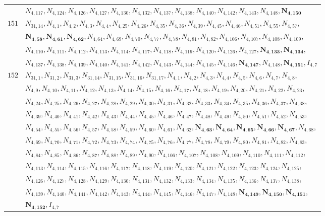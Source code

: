 \documentclass{amsart}
\theoremstyle{plain}
\theoremstyle{definition}
\theoremstyle{remark}
\begin{document}
{\begin{longtable}{ll}
& $N_{4,117}, N_{4,124}, N_{4,126}, N_{4,127}, N_{4,130}, N_{4,132}, N_{4,137}, N_{4,138}, N_{4,140}, N_{4,142}, N_{4,143}, N_{4,148}, \bm{N_{4,150}}$\\
%
$151$ & $N_{31,14}, N_{4,1}, N_{4,2}, N_{4,3}, N_{4,4}, N_{4,25}, N_{4,26}, N_{4,35}, N_{4,36}, N_{4,39}, N_{4,45}, N_{4,46}, N_{4,51}, N_{4,55}, N_{4,57}$,\\ 
& $\bm{N_{4,58}}, \bm{N_{4,61}}, \bm{N_{4,62}}, N_{4,64}, N_{4,69}, N_{4,70}, N_{4,77}, N_{4,78}, N_{4,81}, N_{4,82}, N_{4,106}, N_{4,107}, N_{4,108}, N_{4,109}$,\\ 
& $N_{4,110}, N_{4,111}, N_{4,112}, N_{4,113}, N_{4,114}, N_{4,117}, N_{4,118}, N_{4,119}, N_{4,120}, N_{4,126}, N_{4,127}, \bm{N_{4,133}}, \bm{N_{4,134}}$,\\ 
& $N_{4,137}, N_{4,138}, N_{4,139}, N_{4,140}, N_{4,141}, N_{4,142}, N_{4,143}, N_{4,144}, N_{4,145}, N_{4,146}, \bm{N_{4,147}}, N_{4,148}, \bm{N_{4,151}}, I_{4,7}$\\
$152$ & $N_{31,1}, N_{31,2}, N_{31,3}, N_{31,14}, N_{31,15}, N_{31,16}, N_{31,17}, N_{4,1}, N_{4,2}, N_{4,3}, N_{4,4}, N_{4,5}, N_{4,6}, N_{4,7}, N_{4,8}$,\\ 
& $N_{4,9}, N_{4,10}, N_{4,11}, N_{4,12}, N_{4,13}, N_{4,14}, N_{4,15}, N_{4,16}, N_{4,17}, N_{4,18}, N_{4,19}, N_{4,20}, N_{4,21}, N_{4,22}, N_{4,23}$,\\ 
& $N_{4,24}, N_{4,25}, N_{4,26}, N_{4,27}, N_{4,28}, N_{4,29}, N_{4,30}, N_{4,31}, N_{4,32}, N_{4,33}, N_{4,34}, N_{4,35}, N_{4,36}, N_{4,37}, N_{4,38}$,\\ 
& $N_{4,39}, N_{4,40}, N_{4,41}, N_{4,42}, N_{4,43}, N_{4,44}, N_{4,45}, N_{4,46}, N_{4,47}, N_{4,48}, N_{4,49}, N_{4,50}, N_{4,51}, N_{4,52}, N_{4,53}$,\\ 
& $N_{4,54}, N_{4,55}, N_{4,56}, N_{4,57}, N_{4,58}, N_{4,59}, N_{4,60}, N_{4,61}, N_{4,62}, \bm{N_{4,63}}, \bm{N_{4,64}}, \bm{N_{4,65}}, \bm{N_{4,66}}, \bm{N_{4,67}}, N_{4,68}$,\\ 
& $N_{4,69}, N_{4,70}, N_{4,71}, N_{4,72}, N_{4,73}, N_{4,74}, N_{4,75}, N_{4,76}, N_{4,77}, N_{4,78}, N_{4,79}, N_{4,80}, N_{4,81}, N_{4,82}, N_{4,83}$,\\ 
& $N_{4,84}, N_{4,85}, N_{4,86}, N_{4,87}, N_{4,88}, N_{4,89}, N_{4,90}, N_{4,106}, N_{4,107}, N_{4,108}, N_{4,109}, N_{4,110}, N_{4,111}, N_{4,112}$,\\ 
& $N_{4,113}, N_{4,114}, N_{4,115}, N_{4,116}, N_{4,117}, N_{4,118}, N_{4,119}, N_{4,120}, N_{4,121}, N_{4,122}, N_{4,123}, N_{4,124}, N_{4,125}$,\\ 
& $N_{4,126}, N_{4,127}, N_{4,128}, N_{4,129}, N_{4,130}, N_{4,131}, N_{4,132}, N_{4,133}, N_{4,134}, N_{4,135}, N_{4,136}, N_{4,137}, N_{4,138}$,\\ 
& $N_{4,139}, N_{4,140}, N_{4,141}, N_{4,142}, N_{4,143}, N_{4,144}, N_{4,145}, N_{4,146}, N_{4,147}, N_{4,148}, \bm{N_{4,149}}, \bm{N_{4,150}}, \bm{N_{4,151}}$,\\ 
& $\bm{N_{4,152}}, I_{4,7}$\\
\end{longtable}
}
\vspace*{2mm}
\end{document}
